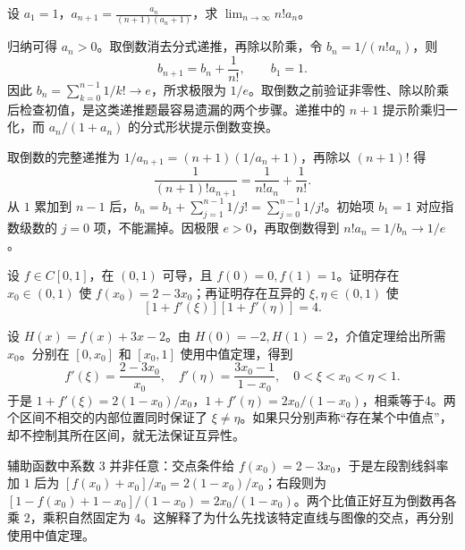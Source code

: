 \documentclass[UTF8,12pt,a4paper,fontset=fandol]{ctexart}
\begin{document}
\begin{example}\label{nm-2020-2}
设 $a_1=1$，$\displaystyle a_{n+1}=\frac{a_n}{(n+1)(a_n+1)}$，求 $\lim_{n\to\infty}n!a_n$。
\end{example}
\begin{solve}
归纳可得 $a_n>0$。取倒数消去分式递推，再除以阶乘，令 $b_n=1/(n!a_n)$，则
\[
 b_{n+1}=b_n+\frac1{n!},\qquad b_1=1.
\]
因此 $b_n=\sum_{k=0}^{n-1}1/k!\to e$，所求极限为 $1/e$。取倒数之前验证非零性、除以阶乘后检查初值，是这类递推题最容易遗漏的两个步骤。递推中的 $n+1$ 提示阶乘归一化，而 $a_n/(1+a_n)$ 的分式形状提示倒数变换。

取倒数的完整递推为 $1/a_{n+1}=(n+1)(1/a_n+1)$，再除以 $(n+1)!$ 得
\[
\frac1{(n+1)!a_{n+1}}=\frac1{n!a_n}+\frac1{n!}.
\]
从 $1$ 累加到 $n-1$ 后，$b_n=b_1+\sum_{j=1}^{n-1}1/j!=\sum_{j=0}^{n-1}1/j!$。初始项 $b_1=1$ 对应指数级数的 $j=0$ 项，不能漏掉。因极限 $e>0$，再取倒数得到 $n!a_n=1/b_n\to1/e$。

\end{solve}

\begin{example}\label{nm-2020-3}
设 $f\in C[0,1]$，在 $(0,1)$ 可导，且 $f(0)=0,f(1)=1$。证明存在 $x_0\in(0,1)$ 使 $f(x_0)=2-3x_0$；再证明存在互异的 $\xi,\eta\in(0,1)$ 使
\[
 [1+f'(\xi)][1+f'(\eta)]=4.
\]
\end{example}
\begin{solve}
设 $H(x)=f(x)+3x-2$。由 $H(0)=-2,H(1)=2$，介值定理给出所需 $x_0$。分别在 $[0,x_0]$ 和 $[x_0,1]$ 使用中值定理，得到
\[
 f'(\xi)=\frac{2-3x_0}{x_0},\quad
 f'(\eta)=\frac{3x_0-1}{1-x_0},\quad
 0<\xi<x_0<\eta<1.
\]
于是 $1+f'(\xi)=2(1-x_0)/x_0$，$1+f'(\eta)=2x_0/(1-x_0)$，相乘等于4。两个区间不相交的内部位置同时保证了 $\xi\ne\eta$。如果只分别声称“存在某个中值点”，却不控制其所在区间，就无法保证互异性。

辅助函数中系数 $3$ 并非任意：交点条件给 $f(x_0)=2-3x_0$，于是左段割线斜率加 $1$ 后为 $[f(x_0)+x_0]/x_0=2(1-x_0)/x_0$；右段则为 $[1-f(x_0)+1-x_0]/(1-x_0)=2x_0/(1-x_0)$。两个比值正好互为倒数再各乘 $2$，乘积自然固定为 $4$。这解释了为什么先找该特定直线与图像的交点，再分别使用中值定理。

\end{solve}
\end{document}
